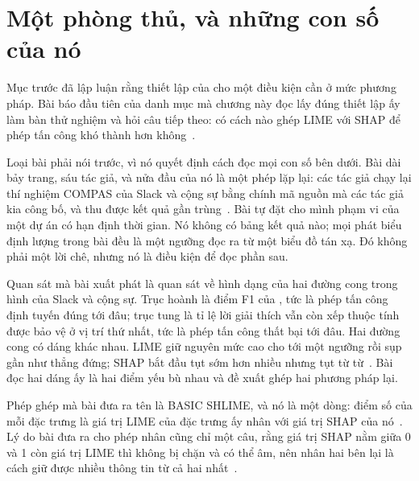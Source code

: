 \section{Một phòng thủ, và những con số của nó}
\label{sec:ch14-mot-phong-thu}

%
Mục trước đã lập luận rằng thiết lập của  cho
một điều kiện cần ở mức phương pháp. Bài báo đầu tiên của danh mục mà chương
này đọc lấy đúng thiết lập ấy làm bàn thử nghiệm và hỏi câu tiếp theo: có cách
nào ghép LIME với SHAP để phép tấn công khó thành hơn
không~\autocite{p27shlime}.

%
Loại bài phải nói trước, vì nó quyết định cách đọc mọi con số bên dưới. Bài dài
bảy trang, sáu tác giả, và nửa đầu của nó là một phép lặp lại: các tác giả chạy
lại thí nghiệm COMPAS của Slack và cộng sự bằng chính mã nguồn mà các tác giả
kia công bố, và thu được kết quả gần trùng~\autocite{p27shlime}. Bài tự đặt cho
mình phạm vi của một dự án có hạn định thời gian. Nó không có bảng kết quả nào;
mọi phát biểu định lượng trong bài đều là một ngưỡng đọc ra từ một biểu đồ tán
xạ. Đó không phải một lời chê, nhưng nó là điều kiện để đọc phần sau.

%
Quan sát mà bài xuất phát là quan sát về hình dạng của hai đường cong trong
hình của Slack và cộng sự. Trục hoành là điểm F1 của
,
tức là phép tấn công định tuyến đúng tới đâu; trục tung là tỉ lệ lời giải thích
vẫn còn xếp thuộc tính được bảo vệ ở vị trí thứ nhất, tức là phép tấn công thất
bại tới đâu. Hai đường cong có dáng khác nhau. LIME giữ nguyên mức cao cho tới
một ngưỡng rồi sụp gần như thẳng đứng; SHAP bắt đầu tụt sớm hơn nhiều nhưng tụt
từ từ~\autocite{p27shlime}. Bài đọc hai dáng ấy là hai điểm yếu bù nhau và đề
xuất ghép hai phương pháp lại.

Phép ghép mà bài đưa ra tên là BASIC SHLIME, và nó là một dòng: điểm số của mỗi
đặc trưng là giá trị LIME của đặc trưng ấy nhân với giá trị SHAP của
nó~\autocite{p27shlime}. Lý do bài đưa ra cho phép nhân cũng chỉ một câu, rằng
giá trị SHAP nằm giữa 0 và 1 còn giá trị LIME thì không bị chặn và có thể âm,
nên nhân hai bên lại là cách giữ được nhiều thông tin từ cả hai
nhất~\autocite{p27shlime}.

